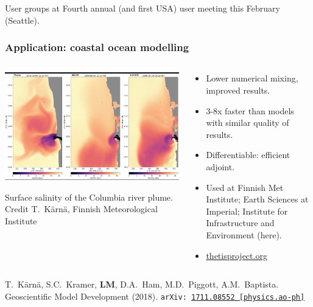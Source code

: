 \documentclass[presentation,aspectratio=43, 10pt]{beamer}
\newcommand{\arxivlink}[2]{{\texttt{arXiv:\,\href{https://arxiv.org/abs/#1}{#1\,[#2]}}}}
\begin{document}
\begin{frame}
\begin{overlayarea}{\textwidth}{0.6\textheight}
\begin{onlyenv}
\begin{block}{User groups at}
      Fourth annual (and first USA) user meeting this February (Seattle).
    \end{block}
  \end{onlyenv}
\end{overlayarea}
\end{frame}

\begin{frame}
  \frametitle{Application: coastal ocean modelling}
  \begin{columns}
    \begin{column}{0.55\textwidth}
      \includegraphics[height=0.45\textheight]{thetis-snapshot}

      {\tiny Surface salinity of the Columbia river plume. Credit
        T.~K\"arn\"a, Finnish Meteorological Institute}
    \end{column}
    \hspace{-0.04\textwidth}
    \begin{column}{0.48\textwidth}
      \begin{itemize}
      \item Lower numerical mixing, improved results.
      \item 3-8x faster than models with similar quality of results.
      \item Differentiable: efficient adjoint.
      \item Used at Finnish Met Institute; Earth Sciences at
        Imperial; Institute for Infrastructure and Environment (here).
      \item \url{thetisproject.org}
       \end{itemize}
    \end{column}
  \end{columns}
  \begin{flushright}
    {\scriptsize T.~K\"arn\"a, S.C.~Kramer, \textbf{LM}, D.A.~Ham,
      M.D.~Piggott, A.M.~Baptista. Geoscientific Model Development
      (2018).
      \arxivlink{1711.08552}{physics.ao-ph}\nocite{Karna:2018}}
  \end{flushright}
\end{frame}
\end{document}
